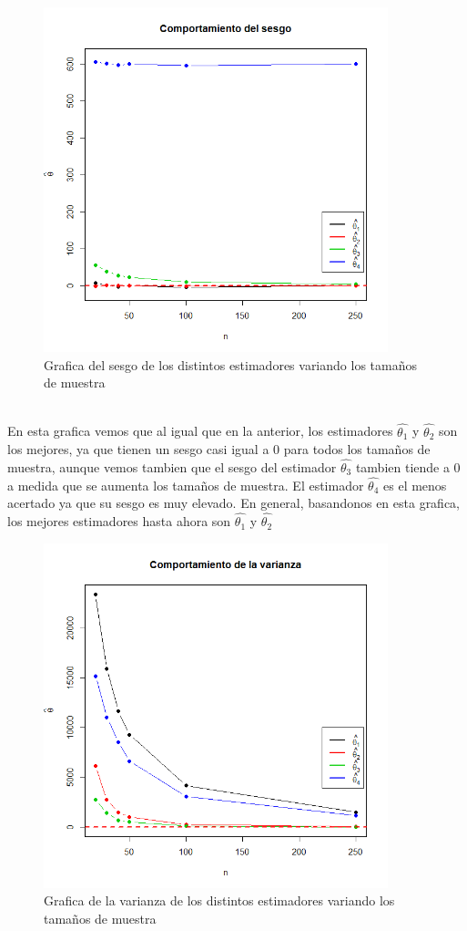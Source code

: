 \documentclass[letterpaper,12pt,onecolumn,titlepage]{article}
\begin{document}
\pagebreak \begin{figure}[!h]
    \begin{center}
        \includegraphics[width=10cm]{Figuras/S.png}
        \caption{Grafica del sesgo de los distintos estimadores variando los tama\~{n}os de muestra}
        \label{fig:Densidad}
    \end{center}
\end{figure}
~\\ En esta grafica vemos que al igual que en la anterior, los estimadores $\hat{\theta_1}$ y $\hat{\theta_2}$ son los mejores, ya que tienen un sesgo casi igual a 0 para todos los tama\~{n}os de muestra, aunque vemos tambien que el sesgo del estimador $\hat{\theta_3}$ tambien tiende a 0 a medida que se aumenta los tama\~{n}os de muestra. El estimador $\hat{\theta_4}$ es el menos acertado ya que su sesgo es muy elevado. En general, basandonos en esta grafica, los mejores estimadores hasta ahora son $\hat{\theta_1}$ y $\hat{\theta_2}$
\pagebreak \begin{figure}[!h]
    \begin{center}
        \includegraphics[width=10cm]{Figuras/V.png}
        \caption{Grafica de la varianza de los distintos estimadores variando los tama\~{n}os de muestra}
        \label{fig:Densidad}
    \end{center}
\end{figure}
\end{document}
